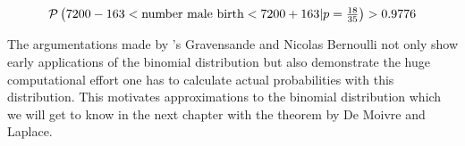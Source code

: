 \begin{align}
    \P{7200-163 < \text{number male birth} < 7200+163|p=\tfrac{18}{35}} > 0.9776
\end{align}

The argumentations made by 's Gravensande and Nicolas Bernoulli not only show early applications of the binomial distribution but also demonstrate the huge computational effort one has to calculate actual probabilities with this distribution. This motivates approximations to the binomial distribution which we will get to know in the next chapter with the theorem by De Moivre and Laplace.
